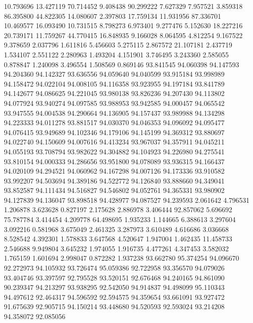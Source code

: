 10.793696
13.427119
70.714452
9.408438
90.299222
7.627329
7.957521
3.859318
86.395800
44.822305
14.080607
2.397803
17.759134
11.931956
87.336701
10.469577
16.093490
10.731515
8.798273
6.973401
9.277476
5.152630
18.227216
20.739171
11.759267
44.770415
16.848935
9.166028
8.064595
4.812254
9.167522
9.378659
2.037796
1.611816
5.456603
5.275115
2.867572
21.107181
2.437719
1.534107
2.551122
2.280963
1.493204
4.151901
3.746495
3.243360
2.585055
0.878847
1.240098
3.496554
1.508569
0.869146
93.841545
94.060398
94.147593
94.204360
94.142327
93.636556
94.059640
94.040599
93.915184
93.998989
94.158472
94.022104
94.008105
94.116358
93.923955
94.197184
93.841789
94.142677
94.086625
94.221045
93.980138
93.826236
94.207430
94.113802
94.077924
93.940274
94.097585
93.988953
93.942585
94.000457
94.065542
93.947555
94.004538
94.290664
94.136905
94.157437
93.989988
94.134298
94.223333
94.011278
93.881517
94.030370
94.046353
94.096092
94.095477
94.076415
93.949689
94.102346
94.179106
94.145199
94.369312
93.880697
94.022740
94.150609
94.007616
94.413234
93.967037
94.357911
94.045211
94.055193
93.708794
93.982622
94.304882
94.104923
94.226980
94.275541
93.810154
94.000333
94.286656
93.951800
94.078089
93.936315
94.166437
94.020109
94.294521
94.060962
94.167298
94.007126
94.173336
93.910582
93.992207
94.503694
94.389186
94.522772
94.126840
93.888660
94.349041
93.852587
94.111434
94.516827
94.546802
94.052761
94.365331
93.980902
94.127839
94.136047
93.898518
94.428977
94.087527
94.239593
2.061642
4.796531
1.206878
3.623628
0.827197
2.175628
2.886978
3.406444
92.857062
5.696692
75.787784
3.414454
4.209778
64.498695
1.935233
1.144665
6.388613
3.297604
3.092216
0.581968
3.675049
2.461325
3.287973
3.610489
4.616686
3.036668
8.528542
4.392301
1.578833
3.647568
4.520647
1.947004
1.462435
11.458733
2.546688
9.949804
3.645232
1.974055
1.916735
4.477261
4.347453
3.582032
1.765159
1.601694
2.998047
0.872282
1.937238
93.662780
95.374254
94.096670
92.272973
94.105932
93.726474
95.059386
92.722958
93.356570
94.079026
93.404746
93.397597
92.795528
93.520151
92.676468
94.240165
94.861090
90.239347
94.213297
93.938295
92.542050
94.914837
94.498099
95.110343
94.497612
92.464317
94.596592
92.594575
94.359654
93.661091
93.927472
91.675639
92.905715
94.150214
93.448680
94.520593
92.593024
93.214208
94.358072
92.085056

